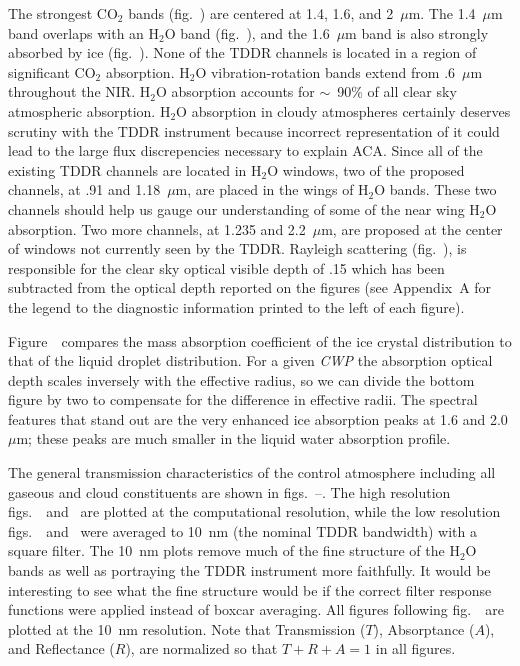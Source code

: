 The strongest CO$_2$ bands (fig.~\/) are
centered at 1.4, 1.6, and 2~$\mu$m. 
The 1.4~$\mu$m band overlaps with an H$_2$O band
(fig.~\/), and the 1.6~$\mu$m band 
is also strongly absorbed by ice (fig.~\/).
None of the TDDR channels is located in a region of significant CO$_2$
absorption. 
H$_2$O vibration-rotation bands extend from .6~$\mu$m throughout the
NIR.  
H$_2$O absorption accounts for $\sim$~90\% of all clear sky atmospheric
absorption. 
H$_2$O absorption in cloudy atmospheres certainly deserves scrutiny
with the TDDR instrument because incorrect representation of it
could lead to the large flux discrepencies necessary to explain ACA.
Since all of the existing TDDR channels are located in H$_2$O windows,
two of the proposed channels, at .91 and 1.18~$\mu$m, are placed in
the wings of H$_2$O bands. 
These two channels should help us gauge our understanding of some of
the near wing H$_2$O absorption. 
Two more channels, at 1.235 and 2.2~$\mu$m, are proposed at the center
of windows not currently seen by the TDDR.
Rayleigh scattering (fig.~\/), is responsible
for the clear sky optical visible depth of .15 which has been
subtracted from the optical depth reported on the figures (see
Appendix~A for the legend to the diagnostic information printed to the
left of each figure).

Figure~\ compares the mass absorption
coefficient of the ice crystal distribution to that of the liquid
droplet distribution.
For a given {\it CWP\/} the absorption optical depth scales inversely
with the effective radius, so we can divide the bottom figure by two
to compensate for the difference in effective radii. 
The spectral features that stand out are the very enhanced ice
absorption peaks at 1.6 and 2.0 $\mu$m; these peaks are much smaller
in the liquid water absorption profile.
\medskip
{}\nobreak

The general transmission characteristics of the control
atmosphere including all gaseous and cloud constituents
are shown in figs.~--.
The high resolution figs.~\ and \
are plotted at the
computational resolution, while the low resolution
figs.~\ and \ were averaged to
10~nm (the nominal TDDR bandwidth) with a square filter.  
The 10~nm plots remove much of the fine structure of the H$_2$O bands
as well as portraying the TDDR instrument more faithfully.
It would be interesting to see what the fine structure would be if the
correct filter response functions were applied instead of boxcar
averaging. 
All figures following fig.~\ are plotted at the
10~nm resolution.
Note that Transmission ($T$), Absorptance ($A$), and Reflectance
($R$), are normalized so that $T + R + A = 1$ in all figures. 


